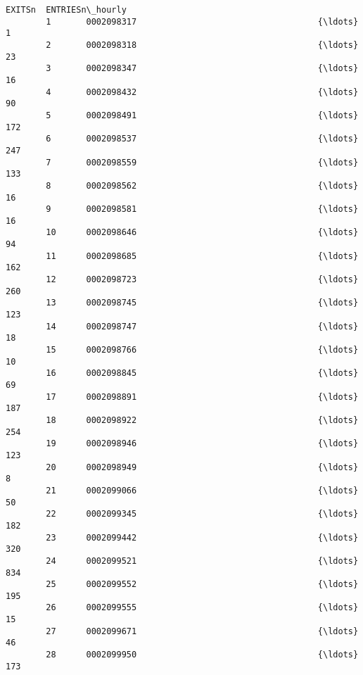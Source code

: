 \documentclass[11pt]{article}
\begin{document}
\begin{Verbatim}[commandchars=\\\{\}]
                                                           EXITSn  ENTRIESn\_hourly  
        1       0002098317                                    {\ldots}                1  
        2       0002098318                                    {\ldots}               23  
        3       0002098347                                    {\ldots}               16  
        4       0002098432                                    {\ldots}               90  
        5       0002098491                                    {\ldots}              172  
        6       0002098537                                    {\ldots}              247  
        7       0002098559                                    {\ldots}              133  
        8       0002098562                                    {\ldots}               16  
        9       0002098581                                    {\ldots}               16  
        10      0002098646                                    {\ldots}               94  
        11      0002098685                                    {\ldots}              162  
        12      0002098723                                    {\ldots}              260  
        13      0002098745                                    {\ldots}              123  
        14      0002098747                                    {\ldots}               18  
        15      0002098766                                    {\ldots}               10  
        16      0002098845                                    {\ldots}               69  
        17      0002098891                                    {\ldots}              187  
        18      0002098922                                    {\ldots}              254  
        19      0002098946                                    {\ldots}              123  
        20      0002098949                                    {\ldots}                8  
        21      0002099066                                    {\ldots}               50  
        22      0002099345                                    {\ldots}              182  
        23      0002099442                                    {\ldots}              320  
        24      0002099521                                    {\ldots}              834  
        25      0002099552                                    {\ldots}              195  
        26      0002099555                                    {\ldots}               15  
        27      0002099671                                    {\ldots}               46  
        28      0002099950                                    {\ldots}              173  

\end{Verbatim}
\end{document}
